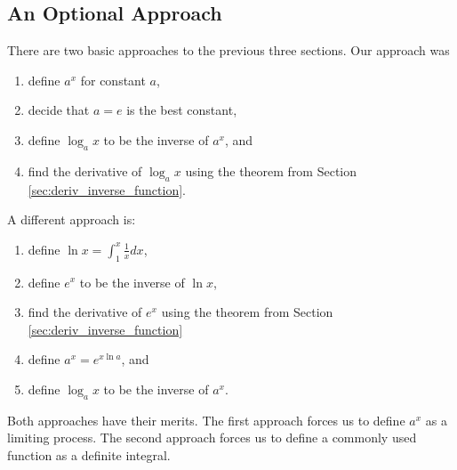 \subsection*{An Optional Approach}
There are two basic approaches to the previous three sections. Our approach was
\begin{enumerate}
 \item define $a^x$ for constant $a$,
 \item decide that $a=e$ is the best constant,
 \item define $\log_a x$ to be the inverse of $a^x$, and
 \item find the derivative of $\log_a x$ using the theorem from
  Section \ref{sec:deriv_inverse_function}.
\end{enumerate}
A different approach is:
\begin{enumerate}
 \item define $\ln x=\int_1^x\frac1x dx$,
 \item define $e^x$ to be the inverse of $\ln x$,
 \item find the derivative of $e^x$ using the theorem from
  Section \ref{sec:deriv_inverse_function}
 \item define $a^x=e^{x\ln a}$, and
 \item define $\log_a x$ to be the inverse of $a^x$.
\end{enumerate}
Both approaches have their merits.  The first approach forces us to define $a^x$ as a limiting process.  The second approach forces us to define a commonly used function as a definite integral.
